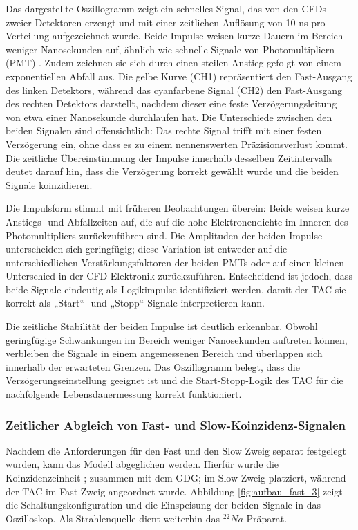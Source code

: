 Das dargestellte Oszillogramm zeigt ein schnelles Signal, das von den CFDs zweier Detektoren erzeugt und mit einer zeitlichen Auflösung von 10 ns pro Verteilung aufgezeichnet wurde. Beide Impulse weisen kurze Dauern im Bereich weniger Nanosekunden auf, ähnlich wie schnelle Signale von Photomultipliern (PMT) . Zudem zeichnen sie sich durch einen steilen Anstieg gefolgt von einem exponentiellen Abfall aus. Die gelbe Kurve (CH1) repräsentiert den Fast-Ausgang des linken Detektors, während das cyanfarbene Signal (CH2) den Fast-Ausgang des rechten Detektors darstellt, nachdem dieser eine feste Verzögerungsleitung von etwa einer Nanosekunde durchlaufen hat. Die Unterschiede zwischen den beiden Signalen sind offensichtlich: Das rechte Signal trifft mit einer festen Verzögerung ein, ohne dass es zu einem nennenswerten Präzisionsverlust kommt. Die zeitliche Übereinstimmung der Impulse innerhalb desselben Zeitintervalls deutet darauf hin, dass die Verzögerung korrekt gewählt wurde und die beiden Signale koinzidieren.

Die Impulsform stimmt mit früheren Beobachtungen überein: Beide weisen kurze Anstiegs- und Abfallzeiten auf, die auf die hohe Elektronendichte im Inneren des Photomultipliers zurückzuführen sind. Die Amplituden der beiden Impulse unterscheiden sich geringfügig; diese Variation ist entweder auf die unterschiedlichen Verstärkungsfaktoren der beiden PMTs oder auf einen kleinen Unterschied in der CFD-Elektronik zurückzuführen. Entscheidend ist jedoch, dass beide Signale eindeutig als Logikimpulse identifiziert werden, damit der TAC sie korrekt als „Start“- und „Stopp“-Signale interpretieren kann.

Die zeitliche Stabilität der beiden Impulse ist deutlich erkennbar. Obwohl geringfügige Schwankungen im Bereich weniger Nanosekunden auftreten können, verbleiben die Signale in einem angemessenen Bereich und überlappen sich innerhalb der erwarteten Grenzen. Das Oszillogramm belegt, dass die Verzögerungseinstellung geeignet ist und die Start-Stopp-Logik des TAC für die nachfolgende Lebensdauermessung korrekt funktioniert.

\subsubsection{Zeitlicher Abgleich von Fast- und Slow-Koinzidenz-Signalen}
Nachdem die Anforderungen für den Fast und den Slow Zweig separat festgelegt wurden, kann das Modell abgeglichen werden. Hierfür wurde die Koinzidenzeinheit ; zusammen mit dem GDG; im Slow-Zweig platziert, während der TAC im Fast-Zweig angeordnet wurde. Abbildung \ref{fig:aufbau_fast_3} zeigt die Schaltungskonfiguration und die Einspeisung der beiden Signale in das Oszilloskop. Als Strahlenquelle dient weiterhin das $^{22}Na$-Präparat.

